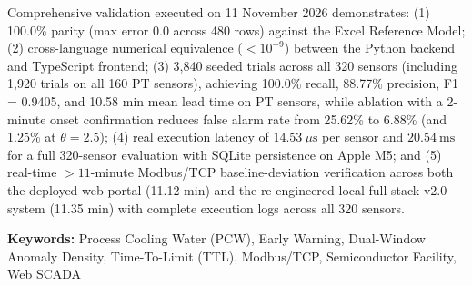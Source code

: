 \documentclass[fontset=none, a4paper, 12pt]{ctexart}
\begin{document}
Comprehensive validation executed on 11 November 2026 demonstrates: (1) 100.0\% parity (max error 0.0 across 480 rows) against the Excel Reference Model; (2) cross-language numerical equivalence ($< 10^{-9}$) between the Python backend and TypeScript frontend; (3) 3,840 seeded trials across all 320 sensors (including 1,920 trials on all 160 PT sensors), achieving 100.0\% recall, 88.77\% precision, F1 = 0.9405, and 10.58 min mean lead time on PT sensors, while ablation with a 2-minute onset confirmation reduces false alarm rate from 25.62\% to 6.88\% (and 1.25\% at $\theta=2.5$); (4) real execution latency of $14.53\ \mu\mathrm{s}$ per sensor and $20.54\ \mathrm{ms}$ for a full 320-sensor evaluation with SQLite persistence on Apple M5; and (5) real-time $>11$-minute Modbus/TCP baseline-deviation verification across both the deployed web portal (11.12 min) and the re-engineered local full-stack v2.0 system (11.35 min) with complete execution logs across all 320 sensors.

\vspace{1em}
\noindent \textbf{Keywords:} Process Cooling Water (PCW), Early Warning, Dual-Window Anomaly Density, Time-To-Limit (TTL), Modbus/TCP, Semiconductor Facility, Web SCADA

\newpage

{}
\tableofcontents
\newpage

{}
\listoftables
\newpage

{}
\listoffigures
\newpage
\end{document}
